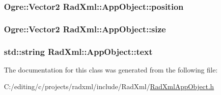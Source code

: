 \hypertarget{class_rad_xml_1_1_app_object_a3d0827a2241267f56f193e340a8f19d3}{
\subsubsection[{position}]{\setlength{\rightskip}{0pt plus 5cm}Ogre\-::\-Vector2 Rad\-Xml\-::\-App\-Object\-::position\hspace{0.3cm}{\ttfamily [protected]}}}\label{class_rad_xml_1_1_app_object_a3d0827a2241267f56f193e340a8f19d3}
\hypertarget{class_rad_xml_1_1_app_object_ad282b53ebeb625b37befa374a1ae24e4}{
\subsubsection[{size}]{\setlength{\rightskip}{0pt plus 5cm}Ogre\-::\-Vector2 Rad\-Xml\-::\-App\-Object\-::size\hspace{0.3cm}{\ttfamily [protected]}}}\label{class_rad_xml_1_1_app_object_ad282b53ebeb625b37befa374a1ae24e4}
\hypertarget{class_rad_xml_1_1_app_object_afe1867c9d16057f9e2d82cad5e8bc0cd}{
\subsubsection[{text}]{\setlength{\rightskip}{0pt plus 5cm}std\-::string Rad\-Xml\-::\-App\-Object\-::text\hspace{0.3cm}{\ttfamily [protected]}}}\label{class_rad_xml_1_1_app_object_afe1867c9d16057f9e2d82cad5e8bc0cd}


The documentation for this class was generated from the following file\-:\begin{DoxyCompactItemize}
\item 
C\-:/editing/c/projects/radxml/include/\-Rad\-Xml/\hyperlink{_rad_xml_app_object_8h}{Rad\-Xml\-App\-Object.\-h}\end{DoxyCompactItemize}
